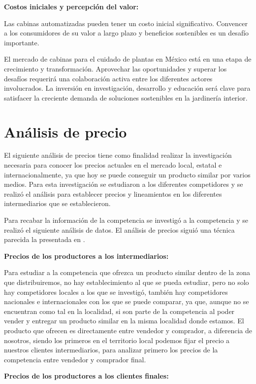 \textbf{Costos iniciales y percepción del valor:}

Las cabinas automatizadas pueden tener un costo inicial significativo.
Convencer a los consumidores de su valor a largo plazo y beneficios sostenibles es un desafío importante.

El mercado de cabinas para el cuidado de plantas en México está en una etapa de crecimiento y transformación. Aprovechar las oportunidades y superar los desafíos requerirá una colaboración activa entre los diferentes actores involucrados. La inversión en investigación, desarrollo y educación será clave para satisfacer la creciente demanda de soluciones sostenibles en la jardinería interior.

\section{Análisis de precio}

El siguiente análisis de precios tiene como finalidad realizar la investigación necesaria para conocer los precios actuales en el mercado local, estatal e internacionalmente, ya que hoy se puede conseguir un producto similar por varios medios. Para esta investigación se estudiaron a los diferentes competidores y se realizó el análisis para establecer precios y lineamientos en los diferentes intermediarios que se establecieron.  

Para recabar la información de la competencia se investigó a la competencia y se realizó el siguiente análisis de datos. El análisis de precios siguió una técnica parecida la presentada en \cite{Gonzalez}. 

\textbf{Precios de los productores a los intermediarios:}

Para estudiar a la competencia que ofrezca un producto similar dentro de la zona que distribuiremos, no hay establecimiento al que se pueda estudiar, pero no solo hay competidores locales a los que se investigó, también hay competidores nacionales e internacionales con los que se puede comparar, ya que, aunque no se encuentran como tal en la localidad, si son parte de la competencia al poder vender y entregar un producto similar en la misma localidad donde estamos. 
El producto que ofrecen es directamente entre vendedor y comprador, a diferencia de nosotros, siendo los primeros en el territorio local podemos fijar el precio a nuestros clientes intermediarios, para analizar primero los precios de la competencia entre vendedor y comprador final. 

\textbf{Precios de los productores a los clientes finales:}

